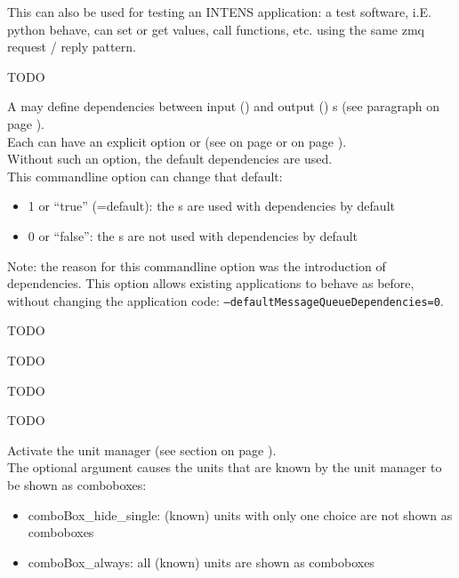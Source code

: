 \begin{description}
  This can also be used for testing an INTENS application: a test software, i.E.
  python behave, can set or get values, call functions, etc. using the same
  zmq request / reply pattern.
%
\item[\texttt{--}sendMessageQueueWithMetadata]
  TODO
%
\item[\texttt{--}defaultMessageQueueDependencies <argument>]
  A \MESSAGEQUEUE{} \REQUEST{} may define dependencies between input (\REQUEST) and output (\RESPONSE) \STREAM{}s
  (see paragraph  on page \pageref{par:stdependency}). \\
  Each \STREAM{} can have an explicit option \DEPENDENCIES{} or \NODEPENDENCIES{}
  (see  on page \pageref{dia:jobmessagequeueoption} or
   on page \pageref{dia:jobpluginoption}). \\
  Without such an option, the default \MESSAGEQUEUE{} dependencies are used. \\
  This commandline option can change that default:
  \begin{itemize}
  \item 1 or ``true'' (=default): the \STREAM{}s are used with dependencies by default
  \item 0 or ``false'': the \STREAM{}s are not used with dependencies by default
  \end{itemize}
  Note: the reason for this commandline option was the introduction of
  \MESSAGEQUEUE{} \REQUEST{} dependencies. This option allows existing applications
  to behave as before, without changing the application code: \newline
  \texttt{--defaultMessageQueueDependencies=0}.
%
\item[\texttt{--}oauth <argument>]
  TODO
%
\item[\texttt{--}oauthAccessTokenUrl <argument>]
  TODO
%
\item[\texttt{--}opentelemetryMetadata]
  TODO
%
\item[\texttt{--}lspWorker]
  TODO
%
\item[\texttt{--}unitManager\mbox{[}=<argument>\mbox{]}]
  Activate the unit manager (see section  on page \pageref{sec:unitmanager}). \\
  The optional argument causes the units that are known by the unit manager to be shown as comboboxes:
  \begin{itemize}
  \item comboBox\_hide\_single: (known) units with only one choice are not shown as comboboxes
  \item comboBox\_always: all (known) units are shown as comboboxes
  \end{itemize}
\end{description}
